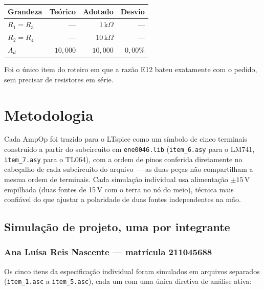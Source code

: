 \documentclass[11pt,a4paper]{article}
\begin{document}
\begin{center}
\begin{tabular}{@{}lrrr@{}}
\toprule
\textbf{Grandeza} & \textbf{Teórico} & \textbf{Adotado} & \textbf{Desvio} \\
\midrule
$R_1=R_3$ & — & $1\,\text{k}\Omega$ & — \\
$R_2=R_4$ & — & $10\,\text{k}\Omega$ & — \\
$A_d$ & $10{,}000$ & $10{,}000$ & $0{,}00\%$ \\
\bottomrule
\end{tabular}
\end{center}

Foi o único item do roteiro em que a razão E12 bateu exatamente com o pedido, sem precisar de
resistores em série.

\section{Metodologia}

Cada AmpOp foi trazido para o LTspice como um símbolo de cinco terminais construído a partir do
subcircuito em \texttt{ene0046.lib} (\texttt{item\_6.asy} para o LM741, \texttt{item\_7.asy}
para o TL064), com a ordem de pinos conferida diretamente no cabeçalho de cada subcircuito do
arquivo — as duas peças não compartilham a mesma ordem de terminais. Cada simulação individual
usa alimentação $\pm15\,\text{V}$ empilhada (duas fontes de 15\,V com o terra no nó do meio),
técnica mais confiável do que ajustar a polaridade de duas fontes independentes na mão.

\subsection{Simulação de projeto, uma por integrante}

\subsubsection*{Ana Luísa Reis Nascente — matrícula 211045688}

Os cinco itens da especificação individual foram simulados em arquivos separados
(\texttt{item\_1.asc} a \texttt{item\_5.asc}), cada um com uma única diretiva de análise ativa:
\end{document}
